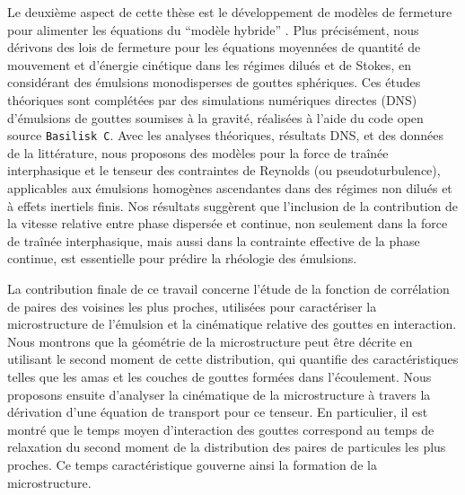 Le deuxi\`eme aspect de cette th\`ese est le d\'eveloppement de mod\`eles de fermeture pour alimenter les \'equations du  ``mod\`ele hybride'' .
Plus pr\'ecis\'ement, nous d\'erivons des lois de fermeture pour les \'equations moyenn\'ees de quantit\'e de mouvement et d'\'energie cin\'etique dans les r\'egimes dilu\'es et de Stokes, en consid\'erant des \'emulsions monodisperses de gouttes sph\'eriques.
Ces \'etudes th\'eoriques sont compl\'et\'ees par des simulations num\'eriques directes (DNS) d'\'emulsions de gouttes soumises \`a la gravit\'e, r\'ealis\'ees \`a l'aide du code open source \texttt{Basilisk C}.
Avec les analyses th\'eoriques, r\'esultats DNS, et des donn\'ees de la litt\'erature, nous proposons des mod\`eles pour la force de tra\^in\'ee interphasique et le tenseur des contraintes de Reynolds (ou pseudoturbulence), applicables aux \'emulsions homog\`enes ascendantes dans des r\'egimes non dilu\'es et \`a effets inertiels finis.
Nos r\'esultats sugg\`erent que l'inclusion de la contribution de la vitesse relative entre phase dispers\'ee et continue, non seulement dans la force de tra\^in\'ee interphasique, mais aussi dans la contrainte effective de la phase continue, est essentielle pour pr\'edire la rh\'eologie des \'emulsions.

La contribution finale de ce travail concerne l'\'etude de la fonction de corr\'elation de paires des voisines les plus proches, utilis\'ees pour caract\'eriser la microstructure de l'\'emulsion et la cin\'ematique relative des gouttes en interaction.
Nous montrons que la g\'eom\'etrie de la microstructure peut \^etre d\'ecrite en utilisant le second moment de cette distribution, qui quantifie des caract\'eristiques telles que les amas et les couches de gouttes form\'ees dans l'\'ecoulement.
Nous proposons ensuite d'analyser la cin\'ematique de la microstructure \`a travers la d\'erivation d'une \'equation de transport pour ce tenseur.
En particulier, il est montr\'e que le temps moyen d'interaction des gouttes correspond au temps de relaxation du second moment de la distribution des paires de particules les plus proches.
Ce temps caract\'eristique gouverne ainsi la formation de la microstructure.
